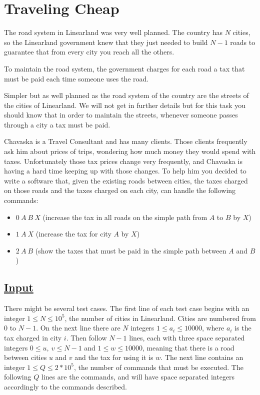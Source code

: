 \documentclass[12pt]{article}
\begin{document}
\pagestyle{empty}

\section*{Traveling Cheap}
The road system in Linearland was very well planned. The country has $N$ cities, so the Linearland government knew that they just needed to build $N-1$ roads to guarantee that from every city you reach all the others.

To maintain the road system, the government charges for each road a tax that must be paid each time someone uses the road.

Simpler but as well planned as the road system of the country are the streets of the cities of Linearland. We will not get in further details but for this task you should know that in order to maintain the streets, whenever someone passes through a city a tax must be paid.

Chavaska is a Travel Consultant and has many clients. Those clients frequently ask him about prices of trips, wondering how much money they would spend with taxes. Unfortunately those tax prices change very frequently, and Chavaska is having a hard time keeping up with those changes. To help him you decided to write a software that, given the existing roads between cities, the taxes charged on those roads and the taxes charged on each city, can handle the following commands:


\begin{itemize}
\item $0\ A\ B\ X$  (increase the tax in all roads on the simple path from $A$ to $B$ by $X$) 
\item $1\ A\ X$ (increase the tax for city $A$ by $X$)
\item $2\ A\ B$ (show the taxes that must be paid in the simple path between $A$ and $B$)
\end{itemize}

\subsection*{\underline{Input}}
There might be several test cases. The first line of each test case begins with an integer $1 \leq N \leq 10^5$, the number of cities in Linearland. Cities are numbered from $0$ to $N-1$. On the next line there are $N$ integers $1 \leq a_i \leq 10000$, where $a_i$ is the tax charged in city $i$.
Then follow $N-1$ lines, each with three space separated integers $0 \leq u,\ v \leq N-1$ and $1 \leq w \leq 10000$, meaning that there is a road between cities $u$ and $v$ and the tax for using it is $w$.
The next line contains an integer $1 \leq Q \leq 2*10^5$, the number of commands that must be executed.
The following $Q$ lines are the commands, and will have space separated integers accordingly to the commands described. 
\end{document}
